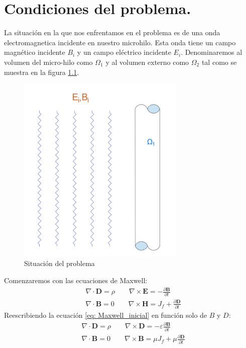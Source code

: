 \chapter{Condiciones del problema.}\label{sec:Condiciones del problema.}
\setcounter{figure}{0}
\setcounter{equation}{0}
La situación en la que nos enfrentamos en el problema es de una onda electromagnetica incidente en nuestro microhilo. Esta onda tiene un campo magnético incidente $B_i$ y un campo eléctrico incidente $E_i$. Denominaremos al volumen del micro-hilo como $\Omega_1$ y al volumen externo como $\Omega_2$ tal como se muestra en la figura \ref{fig:Representacion del problema}.
\begin{figure}[H]
\centering
\includegraphics[width=8cm]{Imagenes/ondaincidente.png}
\caption{Situación del problema} \label{fig:Representacion del problema}
\end{figure}
Comenzaremos con las ecuaciones de Maxwell:
\begin{equation}
\begin{split}
&\nabla\cdot\textbf{D} = \rho\qquad\nabla\times\textbf{E} = -\frac{\partial\textbf{B}}{\partial t}\\
&\nabla\cdot\textbf{B} = 0\qquad\nabla\times\textbf{H} = J_f+\frac{\partial\textbf{D}}{\partial t}
\end{split}
\label{eq: Maxwell_inicial}
\end{equation}
Reescribiendo la ecuación \eqref{eq: Maxwell_inicial} en función solo de $B$ y $D$:
\begin{equation}
\begin{split}
&\nabla\cdot\textbf{D} = \rho\qquad \nabla\times\textbf{D} = -\varepsilon\frac{\partial\textbf{B}}{\partial t}\\
&\nabla\cdot\textbf{B} = 0\qquad\nabla\times\textbf{B} = \mu J_f+\mu\frac{\partial\textbf{D}}{\partial t}
\end{split}
\label{eq: Maxwell_soloBD}
\end{equation}
